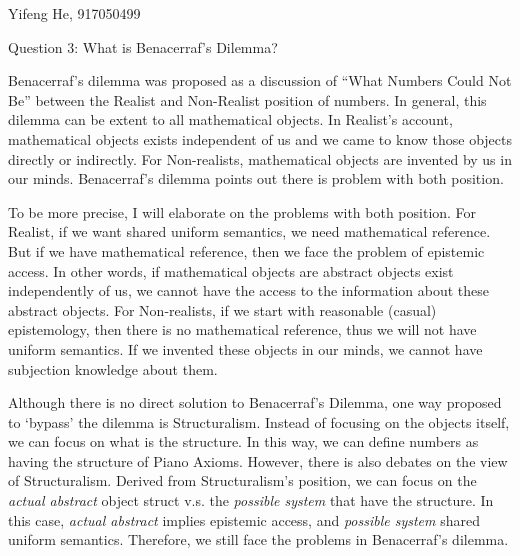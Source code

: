 \documentclass[11pt]{article}
\begin{document}
\begin{center}
    Yifeng He, 917050499
\end{center}

\begin{center}
    Question 3:
    What is Benacerraf's Dilemma?
\end{center}

Benacerraf's dilemma was proposed as a discussion of ``What Numbers Could Not Be'' between
the Realist and Non-Realist position of numbers.
In general, this dilemma can be extent to all mathematical objects.
In Realist's account,
mathematical objects exists independent of us and we came to know those objects directly or indirectly.
For Non-realists,
mathematical objects are invented by us in our minds.
Benacerraf's dilemma points out there is problem with both position.

To be more precise, I will elaborate on the problems with both position.
For Realist, if we want shared uniform semantics, we need mathematical reference.
But if we have mathematical reference, 
then we face the problem of epistemic access.
In other words, if mathematical objects are abstract objects exist independently of us,
we cannot have the access to the information about these abstract objects.
For Non-realists, if we start with reasonable (casual) epistemology,
then there is no mathematical reference, 
thus we will not have uniform semantics.
If we invented these objects in our minds,
we cannot have subjection knowledge about them.

Although there is no direct solution to Benacerraf's Dilemma,
one way proposed to `bypass' the dilemma is Structuralism.
Instead of focusing on the objects itself,
we can focus on what is the structure.
In this way, we can define numbers as having the structure of Piano Axioms.
However, there is also debates on the view of Structuralism.
Derived from Structuralism's position, we can focus on
the \textit{actual abstract} object struct v.s. the \textit{possible system} that have the structure.
In this case, \textit{actual abstract} implies epistemic access,
and \textit{possible system} shared uniform semantics.
Therefore, we still face the problems in Benacerraf's dilemma.
\end{document}
